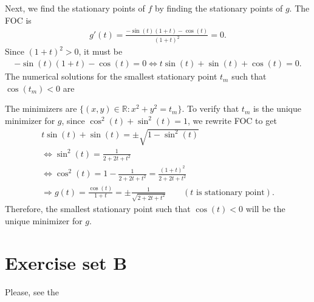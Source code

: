 \documentclass[letterpaper,10pt,english]{jupyterBook}
\begin{document}
\sphinxAtStartPar
Next, we find the stationary points of \(f\) by finding the stationary points of \(g\).
The FOC is
\begin{equation*}
\begin{split}
g'(t) = \frac{-\sin(t)(1+t) - \cos(t)}{(1+t)^2} = 0.
\end{split}
\end{equation*}
\sphinxAtStartPar
Since \((1+t)^2>0\), it must be
\begin{equation*}
\begin{split}
-\sin(t)(1+t) - \cos(t) = 0 ⇔ t\sin(t) + \sin(t) + \cos(t)=0.
\end{split}
\end{equation*}
\sphinxAtStartPar
The numerical solutions for the smallest stationary point \(t_m\) such that \(\cos(t_m)<0\) are

\begin{figure}[htbp]
\centering

\noindent{}
\end{figure}

\sphinxAtStartPar
{}

\sphinxAtStartPar
{}

\sphinxAtStartPar
The minimizers are \(\{(x,y)\in\mathbb{R}: x^2+y^2 = t_m\}\).
To verify that \(t_m\) is the unique minimizer for \(g\), since \(\cos^2(t) + \sin^2(t)=1\), we rewrite FOC to get
\begin{equation*}
\begin{split}
t\sin(t) + \sin(t) = \pm \sqrt{1-\sin^2(t)} \\
⇔ \sin^2(t) = \frac{1}{2 + 2t + t^2} \\
⇔ \cos^2(t) = 1 - \frac{1}{2+2t + t^2}=\frac{(1+t)^2}{2+2t + t^2}\\
⇒ g(t) = \frac{\cos(t)}{1+t} = \pm \frac{1}{\sqrt{2+2t +t^2}}  \qquad (\text{$t$ is stationary point}).
\end{split}
\end{equation*}
\sphinxAtStartPar
Therefore, the smallest stationary point such that \(\cos(t) < 0\) will be the unique minimizer for \(g\).

\sphinxstepscope


\chapter{Exercise set B}
\label{\detokenize{03.exercises.B:exercise-set-b}}\label{\detokenize{03.exercises.B::doc}}
\sphinxAtStartPar
Please, see the
{\hyperref[\detokenize{02.exercises.A::doc}]{}}
\end{document}
